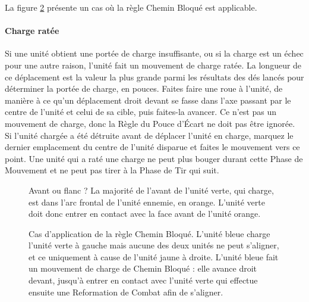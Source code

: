La figure \ref{figure/blockedpath} présente un cas où la règle Chemin Bloqué est applicable.

\hypertarget{failedchargemove}{\paragraph{Charge ratée}}

Si une unité obtient une portée de charge insuffisante, ou si la charge est un échec pour une autre raison, l'unité fait un mouvement de charge ratée. La longueur de ce déplacement est la valeur la plus grande parmi les résultats des dés lancés pour déterminer la portée de charge, en pouces. Faites faire une roue à l'unité, de manière à ce qu'un déplacement droit devant se fasse dans l'axe passant par le centre de l'unité et celui de sa cible, puis faites-la avancer. Ce n'est pas un mouvement de charge, donc la Règle du Pouce d'Écart ne doit pas être ignorée. Si l'unité chargée a été détruite avant de déplacer l'unité en charge, marquez le dernier emplacement du centre de l'unité disparue et faites le mouvement vers ce point. Une unité qui a raté une charge ne peut plus bouger durant cette Phase de Mouvement et ne peut pas tirer à la Phase de Tir qui suit.

\newcommand{\morethanhalfoffrontageisontheorangeunitsfrontarc}{\normalfontsize{Au moins la moitié du front est dans l'arc frontal de l'unité orange}}
\newcommand{\chargefrontageCharge}{\normalfontsize{\flufffont{Charge !}}}

\begin{figure}[!htbp]
\centering
\def\svgwidth{0.6\textwidth}

\caption{Avant ou flanc ?\vspace*{10pt}\newline
La majorité de l'avant de l'unité verte, qui charge, est dans l'arc frontal de l'unité ennemie, en orange. L'unité verte doit donc entrer en contact avec la face avant de l'unité orange.}
\label{figure/chargefrontage}
\end{figure}

\newcommand{\blockedpathCharge}{\normalfontsize{\flufffont{Charge !}}}

\begin{figure}[!htbp]
\centering
\def\svgwidth{0.6\textwidth}

\caption{Cas d'application de la règle Chemin Bloqué.\vspace*{10pt}\newline
L'unité bleue charge l'unité verte à gauche mais aucune des deux unités ne peut s'aligner, et ce uniquement à cause de l'unité jaune à droite. L'unité bleue fait un mouvement de charge de Chemin Bloqué : elle avance droit devant, jusqu'à entrer en contact avec l'unité verte qui effectue ensuite une Reformation de Combat afin de s'aligner.}
\label{figure/blockedpath}
\end{figure}

